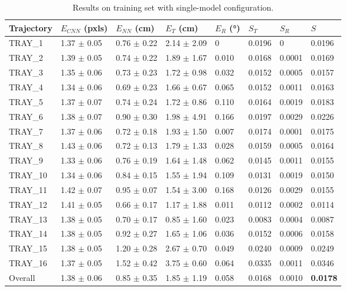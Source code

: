 \begin{table}[H]
\centering
\begin{tabular}{l | l l l l | l l | l}
\toprule
Trajectory & $E_{CNN}$ (pxls) & $E_{NN}$ (cm) & $E_T$ (cm)& $E_R$ (°)& $S_T$ & $S_R$ & $S$\\
\midrule
TRAY\_1 & 1.37 $\pm$ 0.05 & 0.76 $\pm$ 0.22 & 2.14 $\pm$ 2.09 & 0 & 0.0196 & 0 & 0.0196\\
\midrule
TRAY\_2 & 1.39 $\pm$ 0.05 & 0.74 $\pm$ 0.22 & 1.89 $\pm$ 1.67 & 0.010 & 0.0168 & 0.0001 & 0.0169\\
TRAY\_3 & 1.35 $\pm$ 0.06 & 0.73 $\pm$ 0.23 & 1.72 $\pm$ 0.98 & 0.032 & 0.0152 & 0.0005 & 0.0157\\
TRAY\_4 & 1.34 $\pm$ 0.06 & 0.69 $\pm$ 0.23 & 1.66 $\pm$ 0.67 & 0.065 & 0.0152 & 0.0011 & 0.0163\\
TRAY\_5 & 1.37 $\pm$ 0.07 & 0.74 $\pm$ 0.24 & 1.72 $\pm$ 0.86 & 0.110 & 0.0164 & 0.0019 & 0.0183\\
TRAY\_6 & 1.38 $\pm$ 0.07 & 0.90 $\pm$ 0.30 & 1.98 $\pm$ 4.91 & 0.166 & 0.0197 & 0.0029 & 0.0226\\
\midrule
TRAY\_7 & 1.37 $\pm$ 0.06 & 0.72 $\pm$ 0.18 & 1.93 $\pm$ 1.50 & 0.007 & 0.0174 & 0.0001 & 0.0175\\
TRAY\_8 & 1.43 $\pm$ 0.06 & 0.72 $\pm$ 0.13 & 1.79 $\pm$ 1.33 & 0.028 & 0.0159 & 0.0005 & 0.0164\\
TRAY\_9 & 1.33 $\pm$ 0.06 & 0.76 $\pm$ 0.19 & 1.64 $\pm$ 1.48 & 0.062 & 0.0145 & 0.0011 & 0.0155\\
TRAY\_10 & 1.34 $\pm$ 0.06 & 0.84 $\pm$ 0.15 & 1.55 $\pm$ 1.94 & 0.109 & 0.0131 & 0.0019 & 0.0150\\
TRAY\_11 & 1.42 $\pm$ 0.07 & 0.95 $\pm$ 0.07 & 1.54 $\pm$ 3.00 & 0.168 & 0.0126 & 0.0029 & 0.0155\\
\midrule
TRAY\_12 & 1.41 $\pm$ 0.05 & 0.66 $\pm$ 0.17 & 1.17 $\pm$ 1.88 & 0.011 & 0.0112 & 0.0002 & 0.0114\\
TRAY\_13 & 1.38 $\pm$ 0.05 & 0.70 $\pm$ 0.17 & 0.85 $\pm$ 1.60 & 0.023 & 0.0083 & 0.0004 & 0.0087\\
TRAY\_14 & 1.38 $\pm$ 0.05 & 0.92 $\pm$ 0.27 & 1.65 $\pm$ 1.06 & 0.036 & 0.0152 & 0.0006 & 0.0158\\
TRAY\_15 & 1.38 $\pm$ 0.05 & 1.20 $\pm$ 0.28 & 2.67 $\pm$ 0.70 & 0.049 & 0.0240 & 0.0009 & 0.0249\\
TRAY\_16 & 1.37 $\pm$ 0.05 & 1.52 $\pm$ 0.42 & 3.75 $\pm$ 0.60 & 0.064 & 0.0335 & 0.0011 & 0.0346\\
\midrule
Overall & 1.38 $\pm$ 0.06 & 0.85 $\pm$ 0.35 & 1.85 $\pm$ 1.19 & 0.058 & 0.0168 & 0.0010 & \textbf{0.0178}\\
\bottomrule
\end{tabular}
\caption{Results on training set with single-model configuration.}
\label{tab:ResSingTrain}
\end{table}

